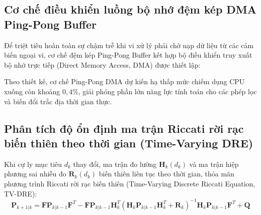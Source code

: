 \subsection{Cơ chế điều khiển luồng bộ nhớ đệm kép DMA Ping-Pong Buffer}

\hspace{0.5cm} Để triệt tiêu hoàn toàn sự chậm trễ khi vi xử lý phải chờ nạp dữ liệu từ các cảm biến ngoại vi, cơ chế đệm kép Ping-Pong Buffer kết hợp bộ điều khiển truy xuất bộ nhớ trực tiếp (Direct Memory Access, DMA) được thiết lập:

\begin{table}[H]
\centering
\caption{Ước lượng thiết kế thông lượng nạp dữ liệu và thời gian chuyển mạch kênh bộ đệm Ping-Pong DMA}
\label{tab:dma-ping-pong-performance}
\end{table}

Theo thiết kế, cơ chế Ping-Pong DMA dự kiến hạ thấp mức chiếm dụng CPU xuống còn khoảng $0{,}4\%$, giải phóng phần lớn năng lực tính toán cho các phép lọc và biến đổi trắc địa thời gian thực.

\subsection{Phân tích độ ổn định ma trận Riccati rời rạc biến thiên theo thời gian (Time-Varying DRE)}

\hspace{0.5cm} Khi cự ly mục tiêu $d_k$ thay đổi, ma trận đo lường $\mathbf{H}_k(d_k)$ và ma trận hiệp phương sai nhiễu đo $\mathbf{R}_k(d_k)$ biến thiên liên tục theo thời gian, thỏa mãn phương trình Riccati rời rạc biến thiên (Time-Varying Discrete Riccati Equation, TV-DRE):
\begin{equation}
\mathbf{P}_{k+1|k} = \mathbf{F} \mathbf{P}_{k|k-1} \mathbf{F}^T - \mathbf{F} \mathbf{P}_{k|k-1} \mathbf{H}_k^T \left( \mathbf{H}_k \mathbf{P}_{k|k-1} \mathbf{H}_k^T + \mathbf{R}_k \right)^{-1} \mathbf{H}_k \mathbf{P}_{k|k-1} \mathbf{F}^T + \mathbf{Q}
\label{eq:time-varying-riccati-equation}
\end{equation}

